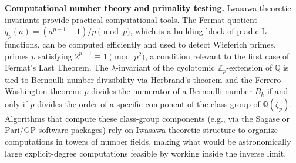 \noindent\textbf{Computational number theory and primality testing.} Iwasawa-theoretic invariants provide practical computational tools. The Fermat quotient $q_p(a)=(a^{p-1}-1)/p\!\pmod{p}$, which is a building block of p-adic L-functions, can be computed efficiently and used to detect Wieferich primes, primes $p$ satisfying $2^{p-1}\equiv 1\pmod{p^2}$, a condition relevant to the first case of Fermat's Last Theorem. The $\lambda$-invariant of the cyclotomic $\mathbb Z_p$-extension of $\mathbb Q$ is tied to Bernoulli-number divisibility via Herbrand's theorem and the Ferrero--Washington theorem: $p$ divides the numerator of a Bernoulli number $B_k$ if and only if $p$ divides the order of a specific component of the class group of $\mathbb Q(\zeta_p)$. Algorithms that compute these class-group components (e.g., via the Sagase or Pari/GP software packages) rely on Iwasawa-theoretic structure to organize computations in towers of number fields, making what would be astronomically large explicit-degree computations feasible by working inside the inverse limit.
